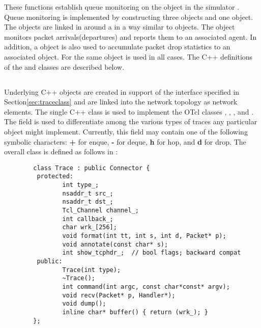 These functions establish queue monitoring on the  object
in the simulator .
Queue monitoring is implemented by constructing three 
objects and one  object.
The  objects are linked in around a  in a way
similar to  objects.
The  object monitors packet arrivals(departures)
and reports them to an associated  agent.
In addition, a  object is also used to accumulate
packet drop statistics to an associated  object.
For  the same  object is used
in all cases.
The C++ definitions of the  and 
classes are described below.

\subsection{}

Underlying C++ objects are created in support of the interface specified
in Section\ref{sec:traceclass} and are linked into the network topology
as network elements.
The single C++  class is used to implement the OTcl
classes , , ,
and .
The  field is used to differentiate among the
various types of
traces any particular  object might implement.
Currently, this field may contain one of the following symbolic characters:
{\bf +} for enque, {\bf -} for deque, {\bf h} for hop, and
{\bf d} for drop.
The overall class is defined as follows in :
\begin{small}
\begin{verbatim}
        class Trace : public Connector {
         protected:
                int type_;
                nsaddr_t src_;
                nsaddr_t dst_;
                Tcl_Channel channel_;
                int callback_;
                char wrk_[256];
                void format(int tt, int s, int d, Packet* p);
                void annotate(const char* s);
                int show_tcphdr_;  // bool flags; backward compat
         public:
                Trace(int type);
                ~Trace();
                int command(int argc, const char*const* argv);
                void recv(Packet* p, Handler*);
                void dump();
                inline char* buffer() { return (wrk_); }
        };
\end{verbatim}
\end{small}

